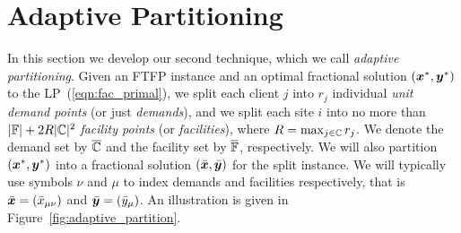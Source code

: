 \documentclass[oneside,final]{ucr}
\def\ssp{\def\baselinestretch{1.0}\large\normalsize}
\begin{document}
\section{Adaptive Partitioning}
\label{sec: adaptive partitioning}

In this section we develop our second technique, which we
call \emph{adaptive partitioning}. Given an FTFP instance
and an optimal fractional solution $(\boldsymbol{x}^\ast, \boldsymbol{y}^\ast)$
to the LP~(\ref{eqn:fac_primal}), we split each client $j$
into $r_j$ individual \emph{unit demand points} (or just
\emph{demands}), and we split each site $i$ into no more
than $|\mathbb{F}|+2R|\mathbb{C}|^2$ \emph{facility points}
(or \emph{facilities}), where
$R=\max_{j\in\mathbb{C}}r_j$. We denote the demand set by
$\overline{\mathbb{C}}$ and the facility set by $\overline{\mathbb{F}}$,
respectively.  We will also partition
$(\boldsymbol{x}^\ast,\boldsymbol{y}^\ast)$ into a fractional solution
$(\bar{\boldsymbol{x}},\bar{\boldsymbol{y}})$ for the split instance.  We will
typically use symbols $\nu$ and $\mu$ to index demands and
facilities respectively, that is $\bar{\boldsymbol{x}} =
({\bar x}_{\mu\nu})$ and $\bar{\boldsymbol{y}} = ({\bar y}_{\mu})$. An
illustration is given in
Figure~\ref{fig:adaptive_partition}.
\ssp
\end{document}
